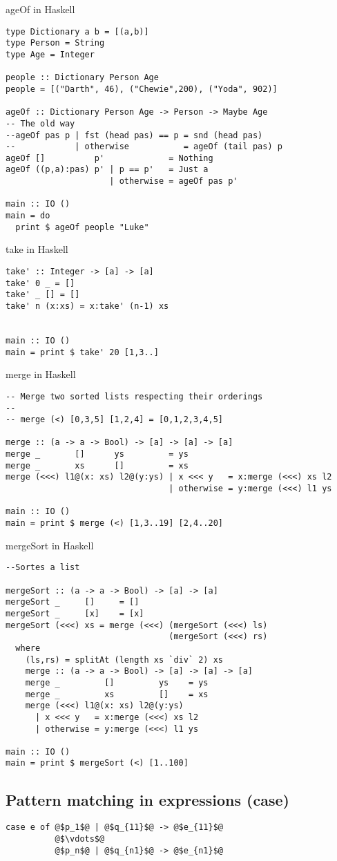 \documentclass{article}
\begin{document}
\begin{listing}
\caption{ageOf in Haskell}
\begin{verbatim}
type Dictionary a b = [(a,b)]
type Person = String
type Age = Integer

people :: Dictionary Person Age
people = [("Darth", 46), ("Chewie",200), ("Yoda", 902)]

ageOf :: Dictionary Person Age -> Person -> Maybe Age
-- The old way
--ageOf pas p | fst (head pas) == p = snd (head pas)
--            | otherwise           = ageOf (tail pas) p
ageOf []          p'             = Nothing
ageOf ((p,a):pas) p' | p == p'   = Just a
                     | otherwise = ageOf pas p'

main :: IO ()
main = do
  print $ ageOf people "Luke"
\end{verbatim}
\end{listing}
\begin{listing}
\caption{take in Haskell}
\begin{verbatim}
take' :: Integer -> [a] -> [a]
take' 0 _ = []
take' _ [] = []
take' n (x:xs) = x:take' (n-1) xs


main :: IO ()
main = print $ take' 20 [1,3..]
\end{verbatim}
\end{listing}
\begin{listing}
\caption{merge in Haskell}
\begin{verbatim}
-- Merge two sorted lists respecting their orderings
--
-- merge (<) [0,3,5] [1,2,4] = [0,1,2,3,4,5]

merge :: (a -> a -> Bool) -> [a] -> [a] -> [a]
merge _       []      ys         = ys
merge _       xs      []         = xs
merge (<<<) l1@(x: xs) l2@(y:ys) | x <<< y   = x:merge (<<<) xs l2
                                 | otherwise = y:merge (<<<) l1 ys

main :: IO ()
main = print $ merge (<) [1,3..19] [2,4..20]
\end{verbatim}
\end{listing}
\begin{listing}
\caption{mergeSort in Haskell}
\begin{verbatim}
--Sortes a list

mergeSort :: (a -> a -> Bool) -> [a] -> [a]
mergeSort _     []     = []
mergeSort _     [x]    = [x]
mergeSort (<<<) xs = merge (<<<) (mergeSort (<<<) ls)
                                 (mergeSort (<<<) rs)
  where
    (ls,rs) = splitAt (length xs `div` 2) xs
    merge :: (a -> a -> Bool) -> [a] -> [a] -> [a]
    merge _         []         ys    = ys
    merge _         xs         []    = xs
    merge (<<<) l1@(x: xs) l2@(y:ys)
      | x <<< y   = x:merge (<<<) xs l2
      | otherwise = y:merge (<<<) l1 ys

main :: IO ()
main = print $ mergeSort (<) [1..100]
\end{verbatim}
\end{listing}
\subsection{Pattern matching in expressions (case)}
\begin{verbatim}
case e of @$p_1$@ | @$q_{11}$@ -> @$e_{11}$@
          @$\vdots$@
          @$p_n$@ | @$q_{n1}$@ -> @$e_{n1}$@
\end{verbatim}
\end{document}
